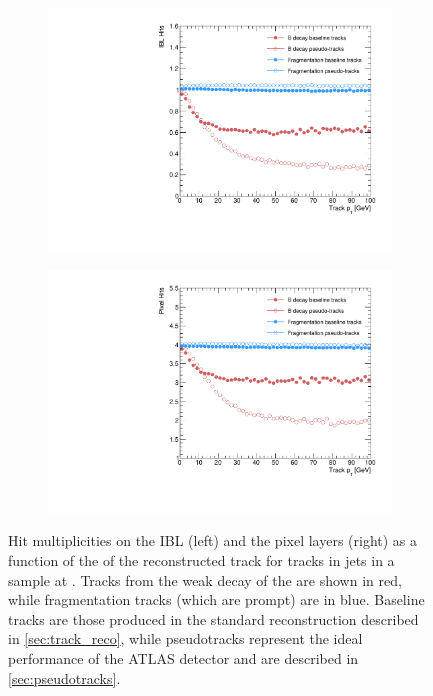 \begin{figure}[!htbp]
  \centering
  \begin{subfigure}{.48\textwidth}
    \centering
    \includegraphics[width=\textwidth]{chapters/3.tracking/figs/overlay_po_nHitsOnIBL_From_B_pT.pdf}
  \end{subfigure}%
  \begin{subfigure}{.48\textwidth}
    \centering
    \includegraphics[width=\textwidth]{chapters/3.tracking/figs/overlay_po_nHitsOnPix_From_B_pT.pdf}
  \end{subfigure}
  \caption{
    Hit multiplicities on the IBL (left) and the pixel layers (right) as a function of the \pT of the reconstructed track for tracks in jets in a \Zprime sample at .
    Tracks from the weak decay of the \bhadron are shown in red, while fragmentation tracks (which are prompt) are in blue.
    Baseline tracks are those produced in the standard reconstruction described in \cref{sec:track_reco}, while pseudotracks represent the ideal performance of the ATLAS detector and are described in \cref{sec:pseudotracks}.
  }
  \label{fig:pseudo_pix_hits}
\end{figure}

